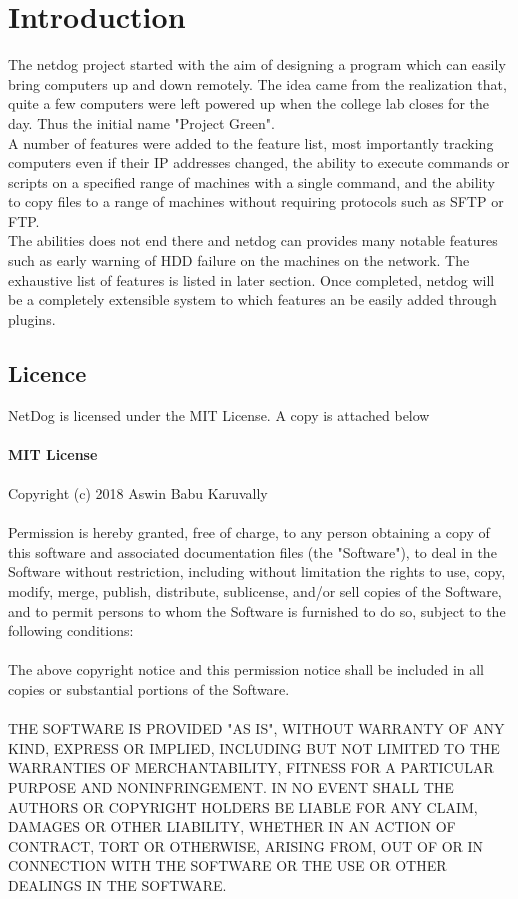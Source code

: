 \chapter{Introduction}
	
\par
The netdog project started with the aim of designing a program which can easily
bring computers up and down remotely. The idea came from the realization that,
quite a few computers were left powered up when the college lab closes for the
day. Thus the initial name "Project Green".\\

A number of features were added to the feature list, most importantly tracking
computers even if their IP addresses changed, the ability to execute commands
or scripts on a specified range of machines with a single command, and the
ability to copy files to a range of machines without requiring protocols such
as SFTP or FTP.\\

The abilities does not end there and netdog can provides many notable features
such as early warning of HDD failure on the machines on the network. The
exhaustive list of features is listed in later section. Once completed, netdog
will be a completely extensible system to which features an be easily added
through plugins.\\
\newpage 

\section{Licence}
NetDog is licensed under the MIT License. A copy is attached below\\\\
\textbf{MIT License}\\\\
Copyright (c) 2018 Aswin Babu Karuvally\\\\
Permission is hereby granted, free of charge, to any person obtaining a copy
of this software and associated documentation files (the "Software"), to deal
in the Software without restriction, including without limitation the rights
to use, copy, modify, merge, publish, distribute, sublicense, and/or sell
copies of the Software, and to permit persons to whom the Software is
furnished to do so, subject to the following conditions:\\\\
The above copyright notice and this permission notice shall be included in all
copies or substantial portions of the Software.\\\\
THE SOFTWARE IS PROVIDED "AS IS", WITHOUT WARRANTY OF ANY KIND, EXPRESS OR
IMPLIED, INCLUDING BUT NOT LIMITED TO THE WARRANTIES OF MERCHANTABILITY,
FITNESS FOR A PARTICULAR PURPOSE AND NONINFRINGEMENT. IN NO EVENT SHALL THE 
AUTHORS OR COPYRIGHT HOLDERS BE LIABLE FOR ANY CLAIM, DAMAGES OR OTHER
LIABILITY, WHETHER IN AN ACTION OF CONTRACT, TORT OR OTHERWISE, ARISING FROM,
OUT OF OR IN CONNECTION WITH THE SOFTWARE OR THE USE OR OTHER DEALINGS IN THE 
SOFTWARE.

